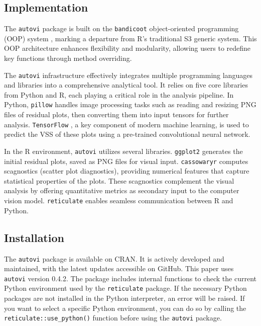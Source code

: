\documentclass[
doublespace,
  times]{anzsauth}
\begin{document}
\subsection{Implementation}\label{sec-autovi-implementation}

The \texttt{autovi} package is built on the \texttt{bandicoot}
object-oriented programming (OOP) system \citep{bandicoot}, marking a
departure from R's traditional S3 generic system. This OOP architecture
enhances flexibility and modularity, allowing users to redefine key
functions through method overriding.

The \texttt{autovi} infrastructure effectively integrates multiple
programming languages and libraries into a comprehensive analytical
tool. It relies on five core libraries from Python and R, each playing a
critical role in the analysis pipeline. In Python, \texttt{pillow}
\citep{clark2015pillow} handles image processing tasks such as reading
and resizing PNG files of residual plots, then converting them into
input tensors for further analysis. \texttt{TensorFlow}
\citep{abadi2016tensorflow}, a key component of modern machine learning,
is used to predict the VSS of these plots using a pre-trained
convolutional neural network.

In the R environment, \texttt{autovi} utilizes several libraries.
\texttt{ggplot2} \citep{ggplot2} generates the initial residual plots,
saved as PNG files for visual input. \texttt{cassowaryr}
\citep{mason2022cassowaryr} computes scagnostics (scatter plot
diagnostics), providing numerical features that capture statistical
properties of the plots. These scagnostics complement the visual
analysis by offering quantitative metrics as secondary input to the
computer vision model. \texttt{reticulate} \citep{reticulate} enables
seamless communication between R and Python.

\subsection{Installation}\label{installation}

The \texttt{autovi} package is available on CRAN. It is actively
developed and maintained, with the latest updates accessible on GitHub.
This paper uses \texttt{autovi} version 0.4.2. The package includes
internal functions to check the current Python environment used by the
\texttt{reticulate} package. If the necessary Python packages are not
installed in the Python interpreter, an error will be raised. If you
want to select a specific Python environment, you can do so by calling
the \texttt{reticulate::use\_python()} function before using the
\texttt{autovi} package.
\end{document}
